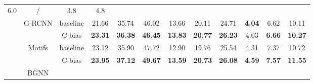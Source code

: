 \documentclass[runningheads]{llncs}
\begin{document}
\begin{table}[!t]
{\begin{tabular}{lccccccccccc}
      6.0                                         & /                                          & 3.8                    & 4.8
      \\
      \cline{2-12}
                                                  & \multirow{2}{*}{G-RCNN}                    &
      baseline                                    & 21.66                                      & 35.74
                                                  & 46.02                                      & 13.66                  & 20.11          &
      24.71                                       & \textbf{4.04}                              & 6.62                   & 10.11
      \\
                                                  &                                            &
      C-bias                                      & \textbf{23.31}                             & \textbf{36.38}
                                                  & \textbf{46.45}                             & \textbf{13.83}         & \textbf{20.77} &
      \textbf{26.23}                              & 4.03                                       & \textbf{6.66}          &
      \textbf{10.27}                                                                                                                       \\
      \cline{2-12}
                                                  & \multirow{2}{*}{Motifs}                    &
      baseline                                    & 23.12                                      & 35.90
                                                  & 47.72                                      & 12.90                  & 19.76          &
      25.54                                       & 4.31                                       & 7.37                   & 10.72
      \\
                                                  &                                            &
      C-bias                                      & \textbf{23.95}                             & \textbf{37.12}
                                                  & \textbf{49.67}                             & \textbf{13.59}         & \textbf{20.73} &
      \textbf{26.08}                              & \textbf{4.59}                              & \textbf{7.57}          &
      \textbf{11.55}                                                                                                                       \\
      \cline{2-12}
                                                  & \multirow{2}{*}{BGNN}                      &

\end{tabular}}
\end{table}
\end{document}
